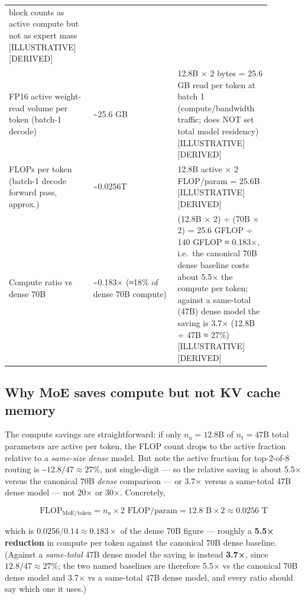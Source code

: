 \begin{longtable}[]{@{}
  >{\raggedright\arraybackslash}p{0.2927\linewidth}
  >{\raggedright\arraybackslash}p{0.2927\linewidth}
  >{\raggedright\arraybackslash}p{0.2927\linewidth}@{}}
block counts as active compute but not as expert mass
\mbox{{[}ILLUSTRATIVE{]}}\hspace{0pt}\mbox{{[}DERIVED{]}} \\
FP16 active weight-read volume per token (batch-1 decode) &
\textasciitilde25.6 GB & 12.8B × 2 bytes = 25.6 GB read per token at
batch 1 (compute/bandwidth traffic; does NOT set total model residency)
\mbox{{[}ILLUSTRATIVE{]}}\hspace{0pt}\mbox{{[}DERIVED{]}} \\
FLOPs per token (batch-1 decode forward pass, approx.) &
\textasciitilde0.0256T & 12.8B active × 2 FLOP/param = 25.6B
\mbox{{[}ILLUSTRATIVE{]}}\hspace{0pt}\mbox{{[}DERIVED{]}} \\
Compute ratio vs dense 70B & \textasciitilde0.183× (≈18\% of dense 70B
compute) & (12.8B × 2) ÷ (70B × 2) = 25.6 GFLOP ÷ 140 GFLOP ≈ 0.183×,
i.e.~the canonical 70B dense baseline costs about 5.5× the compute per
token; against a same-total (47B) dense model the saving is 3.7× (12.8B
÷ 47B ≈ 27\%) \mbox{{[}ILLUSTRATIVE{]}}\hspace{0pt}\mbox{{[}DERIVED{]}} \\
\end{longtable}

\subsection{Why MoE saves compute but not KV cache
memory}\label{why-moe-saves-compute-but-not-kv-cache-memory}

The compute savings are straightforward: if only \(n_a = 12.8\)B of
\(n_t = 47\)B total parameters are active per token, the FLOP count
drops to the active fraction relative to a \emph{same-size dense} model.
But note the active fraction for top-2-of-8 routing is
\textasciitilde{}\(12.8/47 \approx 27\%\), not single-digit --- so the
relative saving is about 5.5× versus the canonical 70B \emph{dense}
comparison --- or 3.7× versus a same-total 47B dense model --- not 20×
or 30×. Concretely,

\[
\text{FLOP}_{\text{MoE/token}} = n_a \times 2 \text{ FLOP/param} = 12.8\text{ B} \times 2 \approx 0.0256\text{ T}
\]

which is \(0.0256/0.14 \approx 0.183\times\) of the dense 70B figure ---
roughly a \textbf{5.5× reduction} in compute per token against the
canonical 70B dense baseline. (Against a \emph{same-total} 47B dense
model the saving is instead \textbf{3.7×}, since
\(12.8/47 \approx 27\%\); the two named baselines are therefore 5.5× vs
the canonical 70B dense model and 3.7× vs a same-total 47B dense model,
and every ratio should say which one it uses.)

